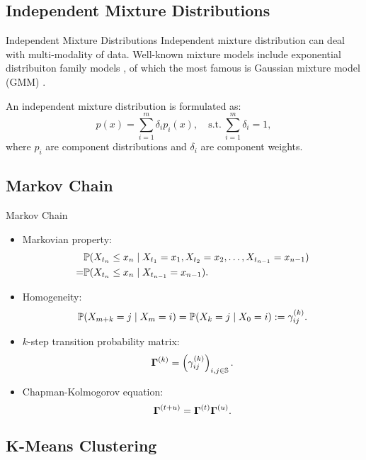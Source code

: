 
\subsection{Independent Mixture Distributions}

\begin{frame}[fragile]{Independent Mixture Distributions}
	Independent mixture distribution can deal with multi-modality of data. 
	Well-known mixture models include exponential distribuiton family models \cite{Hasselblad:1969bk},
	of which the most famous is Gaussian mixture model (GMM) \cite{Behboodian:1970hh}.
	
	An independent mixture distribution is formulated as:
		\[ p(x) = \sum_{i=1}^{m} \delta_ip_i(x), \quad\text{s.t.}\ \sum_{i=1}^{m} \delta_i = 1, \]
	where $p_i$ are component distributions and $\delta_i$ are component weights.
\end{frame}


\subsection{Markov Chain}

\begin{frame}[fragile,t]{Markov Chain}
	\begin{itemize}
	\item Markovian property: 
		\[ \begin{aligned}
		& \mathbb{P}(X_{t_n} \leq x_{n} \mid X_{t_1} = x_{1},X_{t_2} = x_{2},\dots,X_{t_{n-1}} = x_{n-1}) \\
		= & \mathbb{P}(X_{t_n} \leq x_{n} \mid X_{t_{n-1}} = x_{n-1}).
		\end{aligned} \]
	\item Homogeneity:
		\[ \mathbb{P}(X_{m+k} = j \mid X_{m} = i) = \mathbb{P}(X_{k} = j \mid X_{0} = i) := \gamma_{ij}^{(k)}. \]
	\item $k$-step transition probability matrix:
		\[ {\boldsymbol\Gamma}^{(k)} = \left(\gamma_{ij}^{(k)} \right)_{i,j \in {\mathbb S}}. \]
	\item Chapman-Kolmogorov equation:
		\[ {\boldsymbol\Gamma}^{(t+u)} = {\boldsymbol\Gamma}^{(t)}{\boldsymbol\Gamma}^{(u)}. \]
	\end{itemize}
\end{frame}


\subsection{K-Means Clustering}


